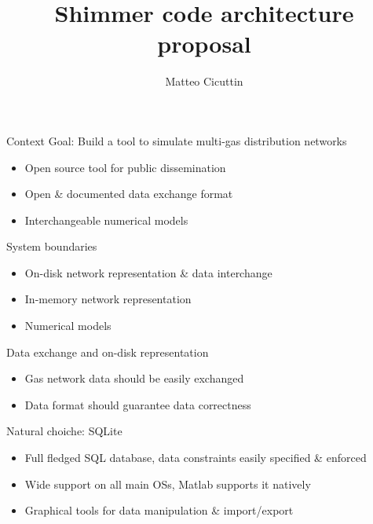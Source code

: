 \documentclass[10pt,aspectratio=169]{beamer}
\title{Shimmer code architecture proposal}
\author{Matteo Cicuttin}
\institute{DISMA - PoliTO}
\begin{document}
\maketitle

\begin{frame}{Context}
    Goal: Build a tool to simulate multi-gas distribution networks

    \vspace{3mm}

    \begin{itemize}
        \item Open source tool for public dissemination
        \item Open \& documented data exchange format
        \item Interchangeable numerical models
    \end{itemize}

\end{frame}

\begin{frame}{System boundaries}
    \begin{itemize}
        \item On-disk network representation \& data interchange
        \item In-memory network representation
        \item Numerical models
    \end{itemize}
\end{frame}

\begin{frame}{Data exchange and on-disk representation}
    \begin{itemize}
        \item Gas network data should be easily exchanged
        \item Data format should guarantee data correctness
    \end{itemize}

    Natural choiche: SQLite

    \begin{itemize}
        \item Full fledged SQL database, data constraints easily specified \& enforced
        \item Wide support on all main OSs, Matlab supports it natively
        \item Graphical tools for data manipulation \& import/export
    \end{itemize}
\end{frame}
\end{document}
